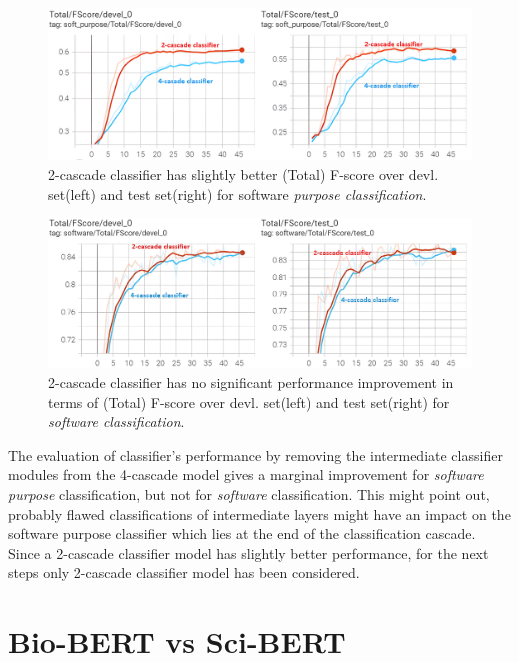 \begin{figure}[htbp]
	\centering
	\includegraphics[width=.78\textwidth]{4.graphics/figures/ch_6/5.2layerClassifier/HD/4casadeVs2cascade}
	\caption{2-cascade classifier has slightly better (Total) F-score over devl. set(left) and test set(right) for software \emph{purpose classification}.}
	\label{fig:chapter06:with}
\end{figure}


\begin{figure}[htbp]
	\centering
	\includegraphics[width=.78\textwidth]{4.graphics/figures/ch_6/5.2layerClassifier/HD/4casadeVs2cascade_software}
	\caption{2-cascade classifier has no significant performance improvement in terms of (Total) F-score over devl. set(left) and test set(right) for \emph{software classification}.}
	\label{fig:chapter06:with}
\end{figure}

The evaluation of classifier’s performance by removing the intermediate classifier modules from the 4-cascade model gives a marginal improvement for \emph{software purpose} classification, but not for \emph{software} classification. This might point out, probably flawed classifications of intermediate layers might have an impact on the software purpose classifier which lies at the end of the classification cascade. \\

Since a 2-cascade classifier model has slightly better performance, for the next steps only 2-cascade classifier model has been considered. 

\section{Bio-BERT vs Sci-BERT}
\label{sec:chapter06:biosci}

